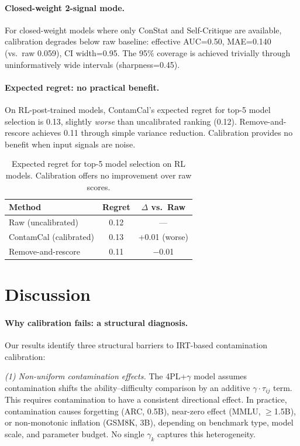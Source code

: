 \documentclass[11pt,a4paper]{article}
\begin{document}
\paragraph{Closed-weight 2-signal mode.}
For closed-weight models where only ConStat and Self-Critique are available, calibration degrades below raw baseline: effective AUC=0.50, MAE=0.140 (vs.\ raw 0.059), CI width=0.95.
The 95\% coverage is achieved trivially through uninformatively wide intervals (sharpness=0.45).

\paragraph{Expected regret: no practical benefit.}
On RL-post-trained models, ContamCal's expected regret for top-5 model selection is 0.13, slightly \emph{worse} than uncalibrated ranking (0.12).
Remove-and-rescore achieves 0.11 through simple variance reduction.
Calibration provides no benefit when input signals are noise.

\begin{table}[t]
\centering
\small
\caption{Expected regret for top-5 model selection on RL models. Calibration offers no improvement over raw scores.}
\label{tab:regret}
\begin{tabular}{lcc}
\toprule
\textbf{Method} & \textbf{Regret} & $\Delta$ \textbf{vs.\ Raw} \\
\midrule
Raw (uncalibrated) & 0.12 & --- \\
ContamCal (calibrated) & 0.13 & +0.01 (worse) \\
Remove-and-rescore & 0.11 & $-$0.01 \\
\bottomrule
\end{tabular}
\end{table}

\section{Discussion}
\label{sec:discussion}

\paragraph{Why calibration fails: a structural diagnosis.}
Our results identify three structural barriers to IRT-based contamination calibration:

\emph{(1) Non-uniform contamination effects.}
The 4PL+$\gamma$ model assumes contamination shifts the ability--difficulty comparison by an additive $\gamma \cdot \tau_{ij}$ term.
This requires contamination to have a consistent directional effect.
In practice, contamination causes forgetting (ARC, 0.5B), near-zero effect (MMLU, $\geq$1.5B), or non-monotonic inflation (GSM8K, 3B), depending on benchmark type, model scale, and parameter budget.
No single $\gamma_k$ captures this heterogeneity.
\end{document}
